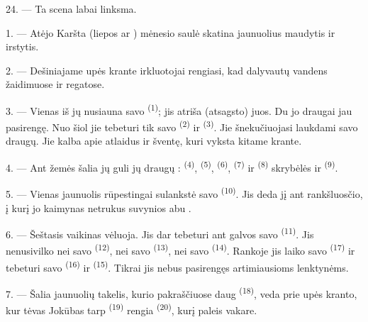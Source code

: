24. --- Ta scena labai linksma.

\VUsaut{4.0mm}
\VUsaut{3.0mm}

\VUsaut{2.4mm}

\VUsaut{3.0mm}

1. --- Atėjo  Karšta  (liepos ar
) mėnesio saulė skatina jaunuolius maudytis ir irstytis.

2. --- Dešiniajame upės krante irkluotojai rengiasi, kad dalyvautų vandens žaidimuose
ir regatose.

3. --- Vienas iš jų nusiauna savo  \textsuperscript{(1)}; jis
atriša (atsagsto) juos. Du jo draugai jau pasirengę. Nuo šiol jie tebeturi tik savo
 \textsuperscript{(2)} ir  \textsuperscript{(3)}. Jie šnekučiuojasi laukdami savo draugų. Jie kalba
apie atlaidus ir šventę, kuri vyksta kitame krante.

4. --- Ant žemės šalia jų guli jų draugų : 
 \textsuperscript{(4)},  \textsuperscript{(5)},
 \textsuperscript{(6)},  \textsuperscript{(7)} ir
 \textsuperscript{(8)} skrybėlės ir 
\textsuperscript{(9)}.

5. --- Vienas jaunuolis rūpestingai sulankstė savo 
\textsuperscript{(10)}. Jis deda jį ant rankšluosčio, į kurį jo kaimynas netrukus
suvynios abu .

6. --- Šeštasis vaikinas vėluoja. Jis dar tebeturi ant galvos savo 
\textsuperscript{(11)}. Jis nenusivilko nei savo 
\textsuperscript{(12)}, nei savo  \textsuperscript{(13)}, nei savo
 \textsuperscript{(14)}. Rankoje jis laiko savo 
\textsuperscript{(17)} ir tebeturi savo  \textsuperscript{(16)} ir
 \textsuperscript{(15)}. Tikrai jis nebus pasirengęs artimiausioms
lenktynėms.

7. --- Šalia jaunuolių takelis, kurio pakraščiuose daug 
\textsuperscript{(18)}, veda prie upės kranto, kur tėvas Jokūbas tarp 
\textsuperscript{(19)} rengia  \textsuperscript{(20)}, kurį
paleis vakare.


